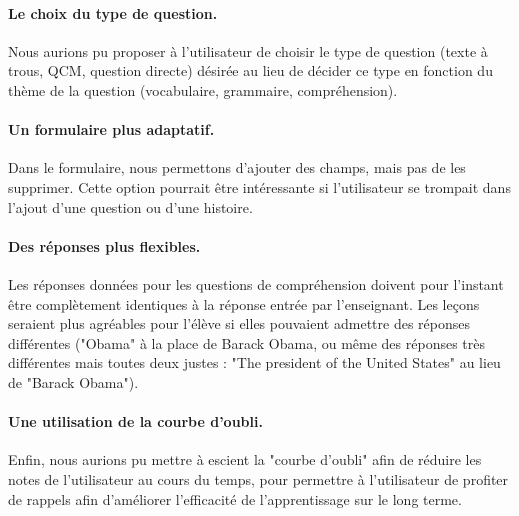 \paragraph{Le choix du type de question.}
Nous aurions pu proposer à l'utilisateur de choisir le type de question (texte à trous, QCM, question directe) désirée au lieu de décider ce type en fonction du thème de la question (vocabulaire, grammaire, compréhension).

\paragraph{Un formulaire plus adaptatif.}
Dans le formulaire, nous permettons d'ajouter des champs, mais pas de les supprimer. Cette option pourrait être intéressante si l'utilisateur se trompait dans l'ajout d'une question ou d'une histoire.

\paragraph{Des réponses plus flexibles.}
Les réponses données pour les questions de compréhension doivent pour l'instant être complètement identiques à la réponse entrée par l'enseignant. Les leçons seraient plus agréables pour l'élève si elles pouvaient admettre des réponses différentes ("Obama" à la place de Barack Obama, ou même des réponses très différentes mais toutes deux justes : "The president of the United States" au lieu de "Barack Obama").

\paragraph{Une utilisation de la courbe d'oubli.}
Enfin, nous aurions pu mettre à escient la "courbe d'oubli" afin de réduire les notes de l'utilisateur au cours du temps, pour permettre à l'utilisateur de profiter de rappels afin d'améliorer l'efficacité de l'apprentissage sur le long terme.